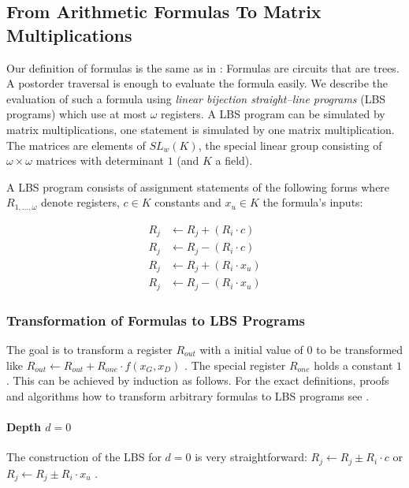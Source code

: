 \documentclass[12pt, a4paper]{article}
\begin{document}
\subsection{From Arithmetic Formulas To Matrix Multiplications}
\label{sec:FormulasToMatrixMuls}

Our definition of formulas is the same as in \cite{cleve91}: Formulas are
circuits that are trees. A postorder traversal is enough to evaluate the formula
easily. We describe the evaluation of such a formula using \emph{linear
bijection straight--line programs} (LBS programs)\cite{cleve91} which use at
most $\omega$ registers. A LBS program can be simulated by matrix
multiplications, one statement is simulated by one matrix multiplication. The
matrices are elements of $SL_w(K)$, the special linear group consisting of
$\omega \times \omega$ matrices with determinant $1$ (and $K$ a field).

A LBS program consists of assignment statements of the following
forms where $R_{1,...,\omega}$ denote registers, $c \in K$ constants and $x_u
\in K$ the formula's inputs:

\begin{align}
R_j & \leftarrow R_j + (R_i \cdot c) \\
R_j & \leftarrow R_j - (R_i \cdot c) \\
R_j & \leftarrow R_j + (R_i \cdot x_u) \\
R_j & \leftarrow R_j - (R_i \cdot x_u)
\end{align}


\subsubsection{Transformation of Formulas to LBS Programs}

The goal is to transform a register $R_{out}$ with a initial value of $0$ to be
transformed like $R_{out} \leftarrow R_{out} + R_{one} \cdot f(x_G,x_D)$ . The
special register $R_{one}$ holds a constant $1$. This can be achieved by
induction as follows.  For the exact definitions, proofs and algorithms how to
transform arbitrary formulas to LBS programs see \cite{cleve91}.


\paragraph{Depth $d = 0$}

The construction of the LBS for $d = 0$ is very straightforward:
$R_j \leftarrow R_j \pm R_i \cdot c$ or $R_j \leftarrow R_j \pm R_i \cdot x_u$ .
\end{document}
